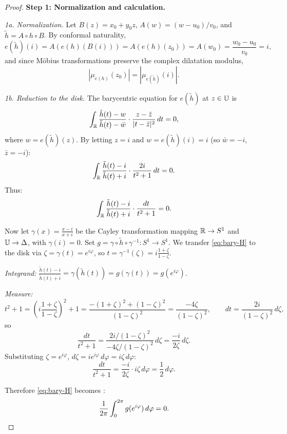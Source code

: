 \begin{proof}
	
	
	\textbf{Step 1: Normalization and calculation.}
	
	\medskip
	\noindent\textit{1a. Normalization.}
	Let $B(z) = x_0 + y_0 z$, $A(w) = (w - u_0)/v_0$, and $\tilde{h} = A \circ h \circ B$. By conformal naturality,
	\[
	e(\tilde{h})(i) = A(e(h)(B(i))) = A(e(h)(z_0)) = A(w_0) = \frac{w_0 - u_0}{v_0} = i,
	\]
	and since M\"obius transformations preserve the complex dilatation modulus,
	\[
	|\mu_{e(h)}(z_0)| = |\mu_{e(\tilde{h})}(i)|.
	\]
	
	\medskip
	\noindent\textit{1b. Reduction to the disk.}
	The barycentric equation for $e(\tilde{h})$ at $z \in \mathbb{U}$ is
	\[
	\int_{\mathbb{R}} \frac{\tilde{h}(t) - w}{\tilde{h}(t) - \bar{w}} \cdot \frac{z - \bar{z}}{|t - \bar{z}|^2}\,dt = 0,
	\]
	where $w = e(\tilde{h})(z)$. By letting $z = i$ and $w = e(\tilde{h})(i) = i$ (so $\bar{w} = -i$, $\bar{z} = -i$):
	\[
	\int_{\mathbb{R}} \frac{\tilde{h}(t) - i}{\tilde{h}(t) + i} \cdot \frac{2i}{t^2 + 1}\,dt = 0.
	\]
	Thus:
	\begin{equation}\label{eq:bary-H}
		\int_{\mathbb{R}} \frac{\tilde{h}(t) - i}{\tilde{h}(t) + i} \cdot \frac{dt}{t^2 + 1} = 0.
	\end{equation}
	
	Now let $\gamma(x) = \frac{x-i}{x+i}$ be the Cayley transformation mapping $\mathbb{R} \to S^1$ and $\mathbb{U} \to \Delta$, with $\gamma(i) = 0$. Set $g = \gamma \circ \tilde{h} \circ \gamma^{-1}: S^1 \to S^1$. We transfer \eqref{eq:bary-H} to the disk via $\zeta = \gamma(t) = e^{i\varphi}$, so $t = \gamma^{-1}(\zeta) = i\frac{1+\zeta}{1-\zeta}$.
	
	\textit{Integrand:}  $\frac{\tilde{h}(t) - i}{\tilde{h}(t) + i} = \gamma(\tilde{h}(t)) = g(\gamma(t)) = g(e^{i\varphi})$.
	
	\textit{Measure:}
	\[
	t^2 + 1 = \left(i\frac{1+\zeta}{1-\zeta}\right)^2 + 1 = \frac{-(1+\zeta)^2 + (1-\zeta)^2}{(1-\zeta)^2} = \frac{-4\zeta}{(1-\zeta)^2}, \qquad dt = \frac{2i}{(1-\zeta)^2}\,d\zeta,
	\]
	so
	\[
	\frac{dt}{t^2+1} = \frac{2i/(1-\zeta)^2}{-4\zeta/(1-\zeta)^2}\,d\zeta = \frac{-i}{2\zeta}\,d\zeta.
	\]
	Substituting $\zeta = e^{i\varphi}$, $d\zeta = ie^{i\varphi}\,d\varphi = i\zeta\,d\varphi$:
	\[
	\frac{dt}{t^2+1} = \frac{-i}{2\zeta} \cdot i\zeta\,d\varphi = \frac{1}{2}\,d\varphi.
	\]
	
	Therefore \eqref{eq:bary-H} becomes :
	\begin{equation}\label{eq:bary-disk}
		\frac{1}{2\pi}\int_0^{2\pi} g(e^{i\varphi}) \,d\varphi = 0.
	\end{equation}
	

\end{proof}
